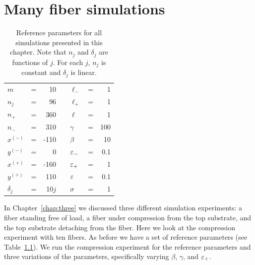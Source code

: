 \chapter{Many fiber simulations} \label{chap:four}

	\begin{table}
		\centering
		\caption{Reference parameters for all simulations presented in this chapter. Note that $n_j$ and $\delta_j$ are functions of $j$. For each $j$, $n_j$ is constant and $\delta_j$ is linear. \label{table:manyfiber_reference}}
		\begin{tabular}{lcrclcr}
			$m$ & = & 10 & \hspace{1in} & $\ell_-$ & = & 1 \\
			$n_j$ & = & 96 & & $\ell_+$ & = & 1 \\
			$n_+$ & = & 360 & & $\ell$ & = & 1 \\
			$n_-$ & = & 310 & & $\gamma$ & = & 100 \\
			$x^{(-)}$ & = & -110 & & $\beta$ & = & 10 \\
			$y^{(-)}$ & = & 0 & & $\varepsilon_-$ & = & 0.1 \\
			$x^{(+)}$ & = & -160 & & $\varepsilon_+$ & = & 1 \\
			$y^{(+)}$ & = & 110 & & $\varepsilon$ & = & 0.1 \\
			$\delta_j$ & = & 10$j$ & & $\sigma$ & = & 1
		\end{tabular}
	\end{table}

	In Chapter~\ref{chap:three} we discussed three different simulation experiments: a fiber standing free of load, a fiber under compression from the top substrate, and the top substrate detaching from the fiber. Here we look at the compression experiment with ten fibers. As before we have a set of reference parameters (see Table~\ref{table:manyfiber_reference}). We run the compression experiment for the reference parameters and three variations of the parameters, specifically varying $\beta$, $\gamma$, and $\varepsilon_+$.

